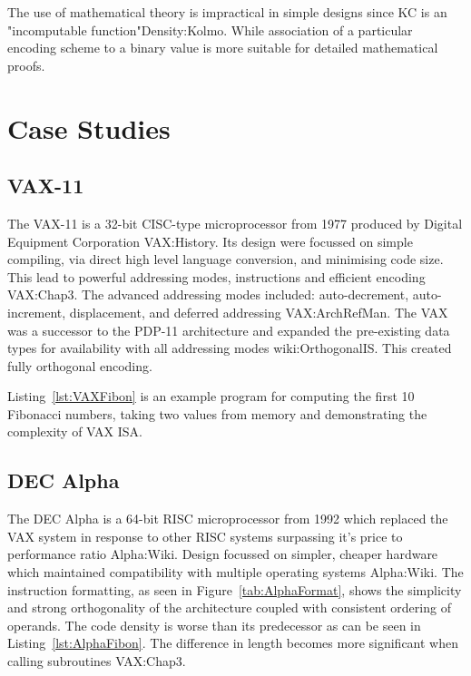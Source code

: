 \documentclass[12pt,a4paper]{article}
\begin{document}
The use of mathematical theory is impractical in simple designs since KC is an "incomputable function"\cite{ref}{Density:Kolmo}. While association of a particular encoding scheme to a binary value is more suitable for detailed mathematical proofs.

\section{Case Studies}

\subsection{VAX-11}
The VAX-11 is a 32-bit CISC-type microprocessor from 1977 produced by Digital Equipment Corporation \cite{ref}{VAX:History}.  Its design were focussed on simple compiling, via direct high level language conversion, and minimising code size. This lead to powerful addressing modes, instructions and efficient encoding \cite{ref}{VAX:Chap3}. The advanced addressing modes included: auto-decrement, auto-increment, displacement, and deferred addressing \cite{ref}{VAX:ArchRefMan}. The VAX was a successor to the PDP-11 architecture and expanded the pre-existing data types for availability with all addressing modes \cite{ref}{wiki:OrthogonalIS}. This created fully orthogonal encoding. 

Listing~\ref{lst:VAXFibon} is an example program for computing the first 10 Fibonacci numbers, taking two values from memory and demonstrating the complexity of VAX ISA.

\newpage


\subsection{DEC Alpha}
The DEC Alpha is a 64-bit RISC microprocessor from 1992 which replaced the VAX system in response to other RISC systems surpassing it's price to performance ratio \cite{ref}{Alpha:Wiki}. Design focussed on simpler, cheaper hardware which maintained compatibility with multiple operating systems \cite{ref}{Alpha:Wiki}. The instruction formatting, as seen in Figure~\ref{tab:AlphaFormat}, shows the simplicity and strong orthogonality of the architecture coupled with consistent ordering of operands. The code density is worse than its predecessor as can be seen in Listing~\ref{lst:AlphaFibon}. The difference in length becomes more significant when calling subroutines \cite{ref}{VAX:Chap3}. 
\end{document}
